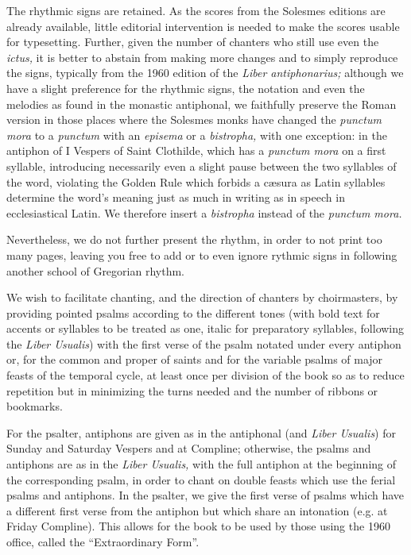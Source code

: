 \begin{enpars}

The rhythmic signs are retained. As the scores from the Solesmes editions are already available, little editorial intervention is needed to make the scores usable for typesetting. Further, given the number of chanters who still use even the \textit{ictus,}  it is better to abstain from making more changes and to simply reproduce the signs, typically from the 1960 edition of the \textit{Liber antiphonarius;} although we have a slight preference for the rhythmic signs, the notation and even the melodies as found in the monastic antiphonal, we faithfully preserve the Roman version in those places where the Solesmes monks have changed the \textit{punctum mora} to a  \textit{punctum} with an \textit{episema} or a \textit{bistropha,} with one exception: in the antiphon of I Vespers of Saint Clothilde, which has a \textit{punctum mora} on a first syllable, introducing necessarily even a slight pause between the two syllables of the word, violating the Golden Rule which forbids a cæsura as Latin syllables determine the word's meaning just as much in writing as in speech in ecclesiastical Latin. We therefore insert a \textit{bistropha} instead of the \textit{punctum mora.}

Nevertheless, we do not further present the rhythm, in order to not print too many pages, leaving you free to add or to even ignore rythmic signs in following another school of Gregorian rhythm.

We wish to facilitate chanting, and the direction of chanters by choirmasters, by providing pointed psalms according to the different tones (with bold text for accents or syllables to be treated as one, italic for preparatory syllables, following the \textit{Liber Usualis}) with the first verse of the psalm notated under every antiphon or, for the common and proper of saints and for the variable psalms of major feasts of the temporal cycle, at least once per division of the book so as to reduce repetition but in minimizing the turns needed and the number of ribbons or bookmarks.

For the psalter, antiphons are given as in the antiphonal (and \textit{Liber Usualis}) for Sunday and Saturday Vespers and at Compline; otherwise, the psalms and antiphons are as in the \textit{Liber Usualis,} with the full antiphon at the beginning of the corresponding psalm, in order to chant on double feasts which use the ferial psalms and antiphons. In the psalter, we give the first verse of psalms which have a different first verse from the antiphon but which share an intonation (e.g. at Friday Compline). This allows for the book to be used by those using the 1960 office, called the ``Extraordinary Form''.


\end{enpars}

